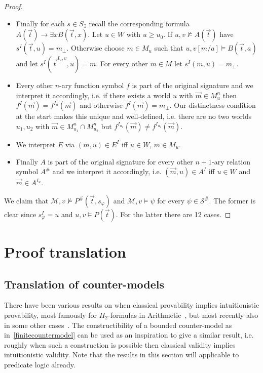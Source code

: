 \documentclass[a4paper,12pt]{report}
\theoremstyle{definition}
\theoremstyle{definition}
\theoremstyle{definition}
\theoremstyle{definition}
\theoremstyle{definition}
\theoremstyle{definition}
\theoremstyle{definition}
\begin{document}
\begin{proof}
\begin{itemize}
\begin{itemize}
				\item Finally for each $s\in S_\exists$ recall the corresponding formula $A(\vec t)\to \exists xB(\vec t, x)$. Let $u\in W$ with $u\geq u_0$. If $u, v\not\models A(\vec t)$ have $s^I(\vec t, u) = m_\bot$. Otherwise choose $m\in M_u$ such that $u, v[m/a]\models B(\vec t, a)$ and let $s^I(\vec t^{I_u, v}, u) = m$. For every other $m\in M$ let $s^I(m, u) = m_\bot$.
				\item Every other $n$-ary function symbol $f$ is part of the original signature and we interpret it accordingly, i.e. if there exists a world $u$ with $\vec m\in M_u^n$ then $f^I(\vec m) = f^{I_u}(\vec m)$ and otherwise  $f^I(\vec m) = m_\bot$. Our distinctness condition at the start makes this unique and well-defined, i.e. there are no two worlds $u_1, u_2$ with $\vec m\in M_{u_1}^n\cap M_{u_2}^n$ but $ f^{I_{u_1}}(\vec m)\neq  f^{I_{u_2}}(\vec m)$.
				\item We interpret $E$ via $(m, u)\in E^{I}$ iff $u\in W$, $m\in M_u$.
				\item Finally $A$ is part of the original signature for every other $n+1$-ary relation symbol $A^\#$ and we interpret it accordingly, i.e. $(\vec m, u)\in A^I$ iff $u\in W$ and $\vec m\in A^{I_u}$. 
			\end{itemize}
		\end{itemize}
		We claim that $\mathcal M, v\not\models P^\#(\vec t, s_\varphi)$ and $\mathcal M, v\models \psi$ for every $\psi\in \mathcal S^\#$. The former is clear since $s_\varphi^I = u$ and $u, v\models P(\vec t)$. For the latter there are 12 cases.
	\end{proof}
	
	
	
	\chapter{Proof translation}

	
	\section{Translation of counter-models}
	
	There have been various results on when classical provability implies intuitionistic provability, most famously for $\Pi_2$-formulas in Arithmetic~\cite{Friedman_1978}, but most recently also in some other cases~\cite{schwichtenberg, practical}. The constructibility of a bounded counter-model as in~\ref{finitecountermodel} can be used as an inspiration to give a similar result, i.e. roughly when such a construction is possible then classical validity implies intuitionistic validity. Note that the results in this section will applicable to predicate logic already.
	
\end{document}
